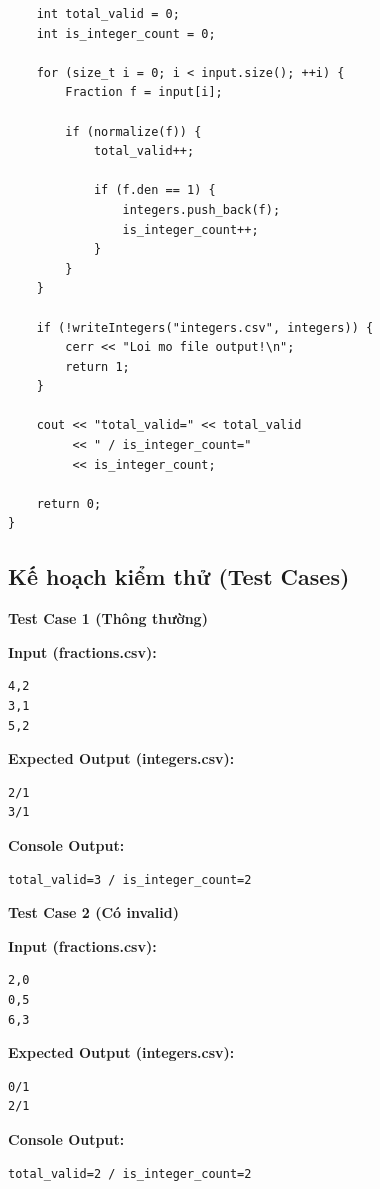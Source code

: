 \begin{lstlisting}
    int total_valid = 0;
    int is_integer_count = 0;

    for (size_t i = 0; i < input.size(); ++i) {
        Fraction f = input[i];

        if (normalize(f)) {
            total_valid++;

            if (f.den == 1) {
                integers.push_back(f);
                is_integer_count++;
            }
        }
    }

    if (!writeIntegers("integers.csv", integers)) {
        cerr << "Loi mo file output!\n";
        return 1;
    }

    cout << "total_valid=" << total_valid
         << " / is_integer_count="
         << is_integer_count;

    return 0;
}
\end{lstlisting}

\subsection{Kế hoạch kiểm thử (Test Cases)}

\textbf{Test Case 1 (Thông thường)}

\textbf{Input (fractions.csv):}
\begin{lstlisting}
4,2
3,1
5,2
\end{lstlisting}

\textbf{Expected Output (integers.csv):}
\begin{lstlisting}
2/1
3/1
\end{lstlisting}

\textbf{Console Output:}
\begin{lstlisting}
total_valid=3 / is_integer_count=2
\end{lstlisting}

\vspace{0.5cm}

\textbf{Test Case 2 (Có invalid)}

\textbf{Input (fractions.csv):}
\begin{lstlisting}
2,0
0,5
6,3
\end{lstlisting}

\textbf{Expected Output (integers.csv):}
\begin{lstlisting}
0/1
2/1
\end{lstlisting}

\textbf{Console Output:}
\begin{lstlisting}
total_valid=2 / is_integer_count=2
\end{lstlisting}

